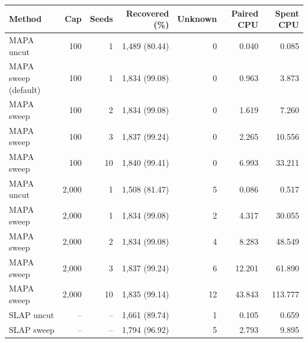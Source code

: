 \begin{tabular}{lrrr rrr}\toprule
Method & Cap & Seeds & Recovered (\%) & Unknown & Paired CPU & Spent CPU\\\midrule
MAPA uncut & 100 & 1 & 1,489 (80.44) & 0 & 0.040 & 0.085\\
MAPA sweep (default) & 100 & 1 & 1,834 (99.08) & 0 & 0.963 & 3.873\\
MAPA sweep & 100 & 2 & 1,834 (99.08) & 0 & 1.619 & 7.260\\
MAPA sweep & 100 & 3 & 1,837 (99.24) & 0 & 2.265 & 10.556\\
MAPA sweep & 100 & 10 & 1,840 (99.41) & 0 & 6.993 & 33.211\\
MAPA uncut & 2,000 & 1 & 1,508 (81.47) & 5 & 0.086 & 0.517\\
MAPA sweep & 2,000 & 1 & 1,834 (99.08) & 2 & 4.317 & 30.055\\
MAPA sweep & 2,000 & 2 & 1,834 (99.08) & 4 & 8.283 & 48.549\\
MAPA sweep & 2,000 & 3 & 1,837 (99.24) & 6 & 12.201 & 61.890\\
MAPA sweep & 2,000 & 10 & 1,835 (99.14) & 12 & 43.843 & 113.777\\
SLAP uncut & -- & -- & 1,661 (89.74) & 1 & 0.105 & 0.659\\
SLAP sweep & -- & -- & 1,794 (96.92) & 5 & 2.793 & 9.895\\
\bottomrule\end{tabular}
